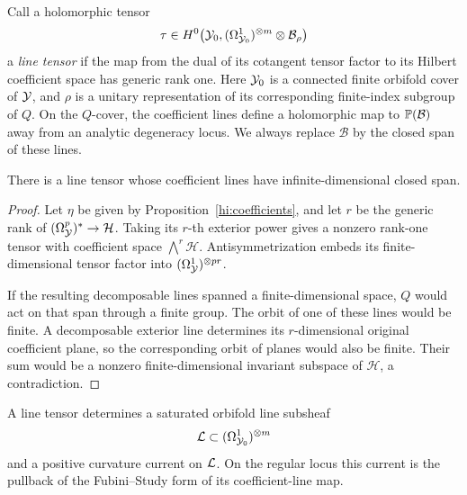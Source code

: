 Call a holomorphic tensor
\[
 \tau\in H^0\bigl(\mathcal Y_0,
       (\Omega_{\mathcal Y_0}^1)^{\otimes m}\otimes\mathcal B_\rho\bigr)
\]
a \emph{line tensor} if the map from the dual of its cotangent
tensor factor to its Hilbert coefficient space has generic rank one.
Here \(\mathcal Y_0\) is a connected finite orbifold cover of \(\mathcal Y\),
and \(\rho\) is a unitary representation of its corresponding
finite-index subgroup of \(Q\). On the \(Q\)-cover, the coefficient
lines define a holomorphic map to \(\mathbb P(\mathcal B)\) away from an
analytic degeneracy locus. We always replace \(\mathcal B\) by the
closed span of these lines.

\begin{lemma}\label{hi:plucker}
There is a line tensor whose coefficient lines have infinite-dimensional
closed span.
\end{lemma}

\begin{proof}
Let \(\eta\) be given by Proposition~\ref{hi:coefficients}, and let
\(r\) be the generic rank of
\((\Omega_{\mathcal Y}^p)^*\to\mathcal H\).
Taking its \(r\)-th exterior power gives a nonzero rank-one tensor
with coefficient space \(\bigwedge^r\mathcal H\).
Antisymmetrization embeds its finite-dimensional tensor factor into
\((\Omega_{\mathcal Y}^1)^{\otimes pr}\).

If the resulting decomposable lines spanned a finite-dimensional
space, \(Q\) would act on that span through a finite group. The orbit
of one of these lines would be finite. A decomposable exterior line
determines its \(r\)-dimensional original coefficient plane, so the
corresponding orbit of planes would also be finite. Their sum would
be a nonzero finite-dimensional invariant subspace of \(\mathcal H\),
a contradiction.
\end{proof}

\begin{lemma}\label{hi:saturated-line}
A line tensor determines a saturated orbifold line subsheaf
\[
 \mathcal L\subset(\Omega_{\mathcal Y_0}^1)^{\otimes m}
\]
and a positive curvature current on \(\mathcal L\). On the regular locus
this current is the pullback of the Fubini--Study form of its
coefficient-line map.
\end{lemma}

